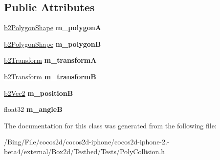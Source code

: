 \subsection*{Public Attributes}
\begin{DoxyCompactItemize}
\item 
\hypertarget{class_poly_collision_a865dc138ef1e2c0a33a9efeda4364906}{\hyperlink{classb2_polygon_shape}{b2\-Polygon\-Shape} {\bfseries m\-\_\-polygon\-A}}\label{class_poly_collision_a865dc138ef1e2c0a33a9efeda4364906}

\item 
\hypertarget{class_poly_collision_a8ea3e6a4c6dd66b0394d1a76a95c9e4c}{\hyperlink{classb2_polygon_shape}{b2\-Polygon\-Shape} {\bfseries m\-\_\-polygon\-B}}\label{class_poly_collision_a8ea3e6a4c6dd66b0394d1a76a95c9e4c}

\item 
\hypertarget{class_poly_collision_ad8206c366ec7c8864a89eef6b3c4430d}{\hyperlink{structb2_transform}{b2\-Transform} {\bfseries m\-\_\-transform\-A}}\label{class_poly_collision_ad8206c366ec7c8864a89eef6b3c4430d}

\item 
\hypertarget{class_poly_collision_aad310da6203737034fcf22afc780ae00}{\hyperlink{structb2_transform}{b2\-Transform} {\bfseries m\-\_\-transform\-B}}\label{class_poly_collision_aad310da6203737034fcf22afc780ae00}

\item 
\hypertarget{class_poly_collision_a189e98f0dd6f8fee4f9d95c28ab2a69b}{\hyperlink{structb2_vec2}{b2\-Vec2} {\bfseries m\-\_\-position\-B}}\label{class_poly_collision_a189e98f0dd6f8fee4f9d95c28ab2a69b}

\item 
\hypertarget{class_poly_collision_a3d9f15197d8f603f33302e56c09d606f}{float32 {\bfseries m\-\_\-angle\-B}}\label{class_poly_collision_a3d9f15197d8f603f33302e56c09d606f}

\end{DoxyCompactItemize}


The documentation for this class was generated from the following file\-:\begin{DoxyCompactItemize}
\item 
/\-Bing/\-File/cocos2d/cocos2d-\/iphone/cocos2d-\/iphone-\/2.-\/beta4/external/\-Box2d/\-Testbed/\-Tests/Poly\-Collision.\-h\end{DoxyCompactItemize}
